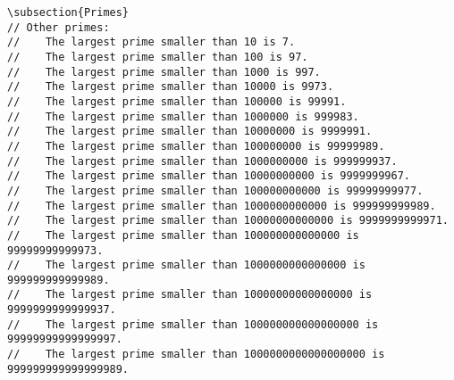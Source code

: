 \begin{lstlisting}
\subsection{Primes}
// Other primes:
//    The largest prime smaller than 10 is 7.
//    The largest prime smaller than 100 is 97.
//    The largest prime smaller than 1000 is 997.
//    The largest prime smaller than 10000 is 9973.
//    The largest prime smaller than 100000 is 99991.
//    The largest prime smaller than 1000000 is 999983.
//    The largest prime smaller than 10000000 is 9999991.
//    The largest prime smaller than 100000000 is 99999989.
//    The largest prime smaller than 1000000000 is 999999937.
//    The largest prime smaller than 10000000000 is 9999999967.
//    The largest prime smaller than 100000000000 is 99999999977.
//    The largest prime smaller than 1000000000000 is 999999999989.
//    The largest prime smaller than 10000000000000 is 9999999999971.
//    The largest prime smaller than 100000000000000 is 99999999999973.
//    The largest prime smaller than 1000000000000000 is 999999999999989.
//    The largest prime smaller than 10000000000000000 is 9999999999999937.
//    The largest prime smaller than 100000000000000000 is 99999999999999997.
//    The largest prime smaller than 1000000000000000000 is 999999999999999989.
\end{lstlisting}